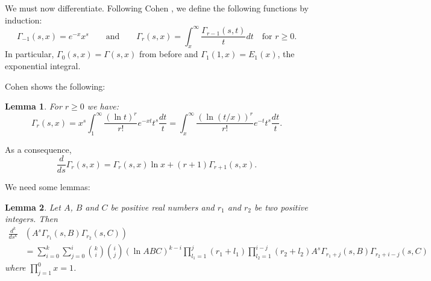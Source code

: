\documentclass{article}
\theoremstyle{plain}
\newtheorem{lemma}{Lemma}
\begin{document}
We must now differentiate. Following Cohen \cite{cohen}, we define the following functions by induction:
\begin{equation*}
\Gamma_{-1}(s,x)= e^{-x}x^s \qquad \text{and} \qquad \Gamma_r(s,x) = \int_x^{\infty}\frac{\Gamma_{r-1}(s,t)}{t}dt \quad \text{for } r\geq 0.
\end{equation*}
In particular, $\Gamma_0(s,x)=\Gamma(s,x)$ from before and $\Gamma_1(1,x)=E_1(x)$, the exponential integral.

Cohen shows the following:
\begin{lemma}
For $r \geq 0$ we have:
\begin{equation*}
\Gamma_r(s,x)=x^s \int_1^{\infty} \frac{(\ln t)^r}{r!}e^{-xt} t^s \frac{dt}{t}=\int_x^{\infty} \frac{(\ln(t/x))^r}{r!}e^{-t}t^s \frac{dt}{t}.
\end{equation*}
\end{lemma}

As a consequence, 
\begin{equation*}
\frac{d}{ds} \Gamma_r(s,x)= \Gamma_r(s,x) \ln x +(r+1)\Gamma_{r+1}(s,x).
\end{equation*}

We need some lemmas:
\begin{lemma}
Let $A$, $B$ and $C$ be positive real numbers and $r_1$ and $r_2$ be two positive integers. Then
\begin{equation*}
\begin{split}
\frac{d^k}{ds^k} & \left( A^{s} \Gamma_{r_1}(s,B) \Gamma_{r_2}(s, C)\right)\\
&= \sum_{i=0}^{k}\sum_{j=0}^{i}\binom{k}{i}\binom{i}{j} (\ln ABC)^{k-i} \prod_{l_1=1}^{j} (r_1+l_1) \prod_{l_2=1}^{i-j}(r_2+l_2)
A^{s} \Gamma_{r_1+j}(s,B) \Gamma_{r_2+i-j}(s, C)
\end{split}
\end{equation*}
where $\prod_{j=1}^{0} x =1$.
\end{lemma}
\end{document}
